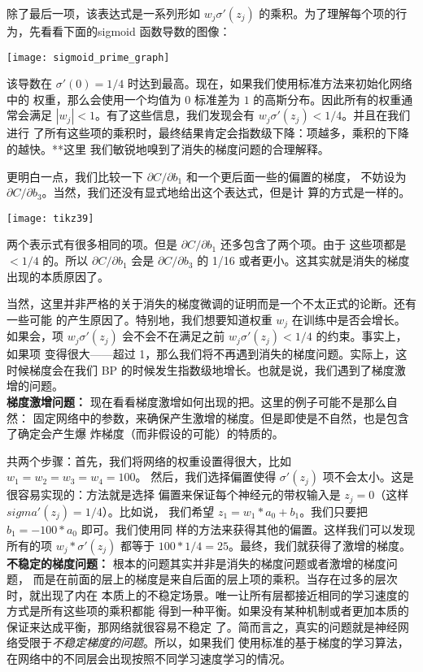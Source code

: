 除了最后一项，该表达式是一系列形如 $w_j \sigma'(z_j)$ 的乘积。为了理解每个项的行
为，先看看下面的sigmoid 函数导数的图像：
\begin{center}
  \texttt{[image: sigmoid\_prime\_graph]}
\end{center}
 
该导数在 $\sigma'(0)=1/4$ 时达到最高。现在，如果我们使用标准方法来初始化网络中的
权重，那么会使用一个均值为 $0$ 标准差为 $1$ 的高斯分布。因此所有的权重通常会满足
$|w_j| < 1$。有了这些信息，我们发现会有 $w_j \sigma'(z_j) < 1/4$。并且在我们进行
了所有这些项的乘积时，最终结果肯定会指数级下降：项越多，乘积的下降的越快。**这里
我们敏锐地嗅到了消失的梯度问题的合理解释。
 
更明白一点，我们比较一下 $\partial C/\partial b_1$ 和一个更后面一些的偏置的梯度，
不妨设为 $\partial C/\partial b_3$。当然，我们还没有显式地给出这个表达式，但是计
算的方式是一样的。 
\begin{center}
  \texttt{[image: tikz39]}
\end{center}

两个表示式有很多相同的项。但是 $\partial C/\partial b_1$ 还多包含了两个项。由于
这些项都是 $< 1/4$ 的。所以 $\partial C/\partial b_1$ 会是 $\partial C/\partial
b_3$ 的 1/16 或者更小。这其实就是消失的梯度出现的本质原因了。

当然，这里并非严格的关于消失的梯度微调的证明而是一个不太正式的论断。还有一些可能
的产生原因了。特别地，我们想要知道权重 $w_j$ 在训练中是否会增长。如果会，项 $w_j
\sigma'(z_j)$ 会不会不在满足之前 $w_j \sigma'(z_j) < 1/4$ 的约束。事实上，如果项
变得很大——超过 1，那么我们将不再遇到消失的梯度问题。实际上，这时候梯度会在我们
BP 的时候发生指数级地增长。也就是说，我们遇到了梯度激增的问题。\\

\textbf{梯度激增问题：} 现在看看梯度激增如何出现的把。这里的例子可能不是那么自然：
固定网络中的参数，来确保产生激增的梯度。但是即使是不自然，也是包含了确定会产生爆
炸梯度（而非假设的可能）的特质的。
 
共两个步骤：首先，我们将网络的权重设置得很大，比如 $w_1 = w_2 = w_3 = w_4 = 100$。
然后，我们选择偏置使得 $\sigma'(z_j)$ 项不会太小。这是很容易实现的：方法就是选择
偏置来保证每个神经元的带权输入是 $z_j = 0$（这样 $sigma'(z_j) = 1/4$）。比如说，
我们希望 $z_1 = w_1 * a_0 + b_1$。我们只要把 $b_1 = -100 * a_0$ 即可。我们使用同
样的方法来获得其他的偏置。这样我们可以发现所有的项 $w_j * \sigma'(z_j)$ 都等于
$100*1/4 = 25$。最终，我们就获得了激增的梯度。\\
 
\textbf{不稳定的梯度问题：} 根本的问题其实并非是消失的梯度问题或者激增的梯度问题，
而是在前面的层上的梯度是来自后面的层上项的乘积。当存在过多的层次时，就出现了内在
本质上的不稳定场景。唯一让所有层都接近相同的学习速度的方式是所有这些项的乘积都能
得到一种平衡。如果没有某种机制或者更加本质的保证来达成平衡，那网络就很容易不稳定
了。简而言之，真实的问题就是神经网络受限于\emph{不稳定梯度的问题}。所以，如果我们
使用标准的基于梯度的学习算法，在网络中的不同层会出现按照不同学习速度学习的情况。

